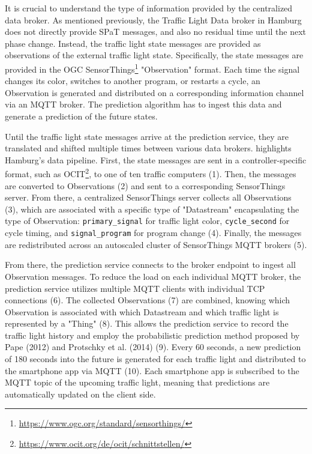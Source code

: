 It is crucial to understand the type of information provided by the centralized data broker. As mentioned previously, the Traffic Light Data broker in Hamburg does not directly provide SPaT messages, and also no residual time until the next phase change. Instead, the traffic light state messages are provided as observations of the external traffic light state. Specifically, the state messages are provided in the OGC SensorThings\footnote{\url{https://www.ogc.org/standard/sensorthings/}} "Observation" format. Each time the signal changes its color, switches to another program, or restarts a cycle, an Observation is generated and distributed on a corresponding information channel via an MQTT broker. The prediction algorithm has to ingest this data and generate a prediction of the future states.

Until the traffic light state messages arrive at the prediction service, they are translated and shifted multiple times between various data brokers.  highlights Hamburg's data pipeline. First, the state messages are sent in a controller-specific format, such as OCIT\footnote{\url{https://www.ocit.org/de/ocit/schnittstellen/}}, to one of ten traffic computers (1). Then, the messages are converted to Observations (2) and sent to a corresponding SensorThings server. From there, a centralized SensorThings server collects all Observations (3), which are associated with a specific type of "Datastream" encapsulating the type of Observation: \texttt{primary\_signal} for traffic light color, \texttt{cycle\_second} for cycle timing, and \texttt{signal\_program} for program change (4). Finally, the messages are redistributed across an autoscaled cluster of SensorThings MQTT brokers (5). 

From there, the prediction service connects to the broker endpoint to ingest all Observation messages. To reduce the load on each individual MQTT broker, the prediction service utilizes multiple MQTT clients with individual TCP connections (6). The collected Observations (7) are combined, knowing which Observation is associated with which Datastream and which traffic light is represented by a "Thing" (8). This allows the prediction service to record the traffic light history and employ the probabilistic prediction method proposed by Pape (2012) \cite{pape_untersuchung_2012} and Protschky et al. (2014) \cite{protschky_extensive_2014, protschky_adaptive_2014} (9). Every 60 seconds, a new prediction of 180 seconds into the future is generated for each traffic light and distributed to the smartphone app via MQTT (10). Each smartphone app is subscribed to the MQTT topic of the upcoming traffic light, meaning that predictions are automatically updated on the client side.

